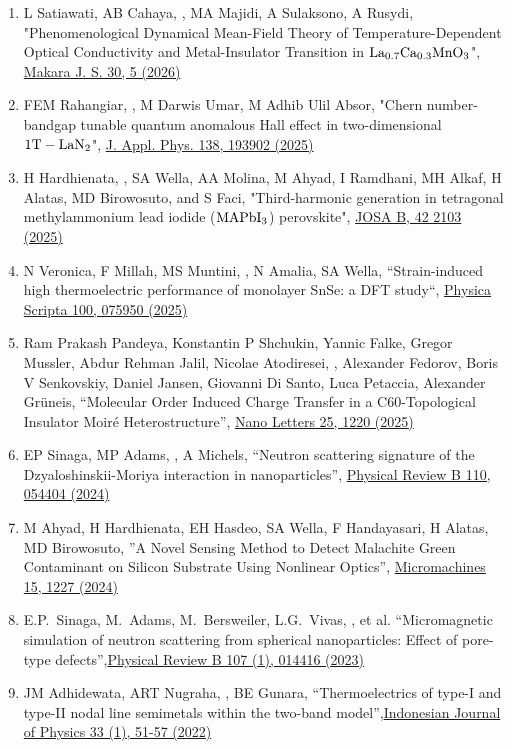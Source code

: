 \begin{enumerate}
\item L Satiawati, AB Cahaya, \hes, MA Majidi, A Sulaksono, A Rusydi, "Phenomenological Dynamical Mean-Field Theory of Temperature-Dependent Optical Conductivity and Metal-Insulator Transition in $\rm La_{0. 7}Ca_{0. 3}MnO_3$", \href{https://doi.org/10.7454/mss.v30i2.3165}{Makara J. S. 30, 5 (2026)}
\item FEM Rahangiar, \hes, M Darwis Umar, M Adhib Ulil Absor, "Chern number-bandgap tunable quantum anomalous Hall effect in two-dimensional $\rm 1T-LaN_2$", 
\href{https://doi.org/10.1063/5.0281234}{J. Appl. Phys. 138, 193902 (2025)}
\item H Hardhienata, \hes, SA Wella, AA Molina, M Ahyad, I Ramdhani, MH Alkaf, H Alatas, MD Birowosuto, and S Faci, "Third-harmonic generation in tetragonal methylammonium lead iodide ($\rm MAPbI_3$) perovskite", \href{https://doi.org/10.1364/JOSAB.566006}{JOSA B, 42 2103 (2025)}
  \item N Veronica, F Millah, MS Muntini, \hes, N Amalia, SA Wella, ``Strain-induced high thermoelectric performance of monolayer SnSe: a DFT study``, \href{https://iopscience.iop.org/article/10.1088/1402-4896/addf8e/meta}{Physica Scripta 100, 075950 (2025)}
  \item Ram Prakash Pandeya, Konstantin P Shchukin, Yannic Falke, Gregor Mussler, Abdur Rehman Jalil, Nicolae Atodiresei, \hes, Alexander Fedorov, Boris V Senkovskiy, Daniel Jansen, Giovanni Di Santo, Luca Petaccia, Alexander Gr\"uneis, ``Molecular Order Induced Charge Transfer in a C60-Topological Insulator Moir\'e Heterostructure'', \href{https://pubs.acs.org/doi/abs/10.1021/acs.nanolett.4c06294}{Nano Letters 25, 1220 (2025)}
 \item EP Sinaga, MP Adams, \hes, A Michels, ``Neutron scattering signature of the Dzyaloshinskii-Moriya interaction in nanoparticles'', \href{https://journals.aps.org/prb/abstract/10.1103/PhysRevB.110.054404}{
   Physical Review B 110, 054404 (2024)}
 \item M Ahyad, H Hardhienata, EH Hasdeo, SA Wella, F Handayasari, H Alatas, MD Birowosuto, ''A Novel Sensing Method to Detect Malachite Green Contaminant on Silicon Substrate Using Nonlinear Optics'', \href{https://www.mdpi.com/2072-666X/15/10/1227} {Micromachines 15, 1227 (2024)}   
 \item E.P.~Sinaga, M.~Adams, M.~Bersweiler, L.G.~Vivas, \hes, et al.
   ``Micromagnetic simulation of neutron scattering from spherical nanoparticles: Effect of pore-type defects'',\href{https://doi.org/10.1103/PhysRevB.107.014416}{Physical Review B 107 (1), 014416 (2023)}
 \item JM Adhidewata, ART Nugraha, \hes, BE Gunara, ``Thermoelectrics of type-I and type-II nodal line semimetals within the two-band model'',\href{https://ijphysics.fi.itb.ac.id/index.php/ijp/article/download/326/307}{Indonesian Journal of Physics 33 (1), 51-57 (2022)}
   

\end{enumerate}
